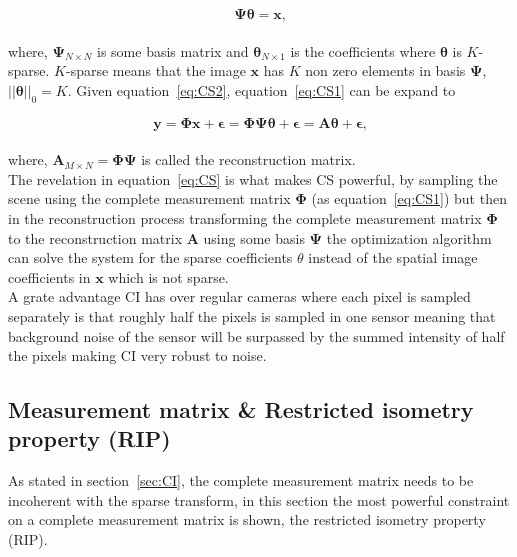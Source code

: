 \begin{equation}
\label{eq:CS2}
   \mathbf{ \Psi \theta = x }\text{,}
\end{equation}\\[0.1in]

where, $\mathbf{\Psi}_{N \times N}$ is some basis matrix and
$\mathbf{\theta}_{N\times1}$ is the coefficients where $\mathbf{\theta}$ is $K$-sparse. $K$-sparse means that the image $\mathbf{x}$ has $K$ non zero elements in basis $\mathbf{\Psi}$, $||\mathbf{\theta}||_0 = K$. Given equation~\ref{eq:CS2}, equation~\ref{eq:CS1} can be expand to


\begin{equation}
   \mathbf{ y = \Phi x + \epsilon = \Phi \Psi \theta + \epsilon = A \theta + \epsilon }\text{,}
   \label{eq:CS}
\end{equation}\\[0.1in]

where, $\textbf{A}_{M \times N} = \mathbf{\Phi \Psi}$ is called the reconstruction matrix.\\[0.1in] 

The revelation in equation~\ref{eq:CS} is what makes CS powerful, by sampling the scene using the complete measurement matrix $\mathbf{\Phi}$ (as equation~\ref{eq:CS1}) but then in the reconstruction process transforming the complete measurement matrix $\mathbf{\Phi}$ to the reconstruction matrix $\mathbf{A}$ using some basis $\mathbf{\Psi}$ the optimization algorithm can solve the system for the sparse coefficients $\theta$ instead of the spatial image coefficients in $\mathbf{x}$ which is not sparse.\cite{book:sm}\\[0.1in]

A grate advantage CI has over regular cameras where each pixel is sampled separately is that roughly half the pixels is sampled in one sensor meaning that background noise of the sensor will be surpassed by the summed intensity of half the pixels making CI very robust to noise.  


\subsection{Measurement matrix \& Restricted isometry property (RIP)}
\label{sec:mm_RIP}
As stated in section~\ref{sec:CI}, the complete measurement matrix needs to be incoherent with the sparse transform, in this section the most powerful constraint on a complete measurement matrix is shown, the restricted isometry property (RIP). \\[0.1in]


